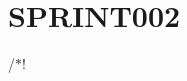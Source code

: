 \chapter{SPRINT002}
\hypertarget{md__x_1_2_d_o_c_i_n_2_s_p_r_i_n_t002}{}\label{md__x_1_2_d_o_c_i_n_2_s_p_r_i_n_t002}
/\texorpdfstring{$\ast$}{*}! 